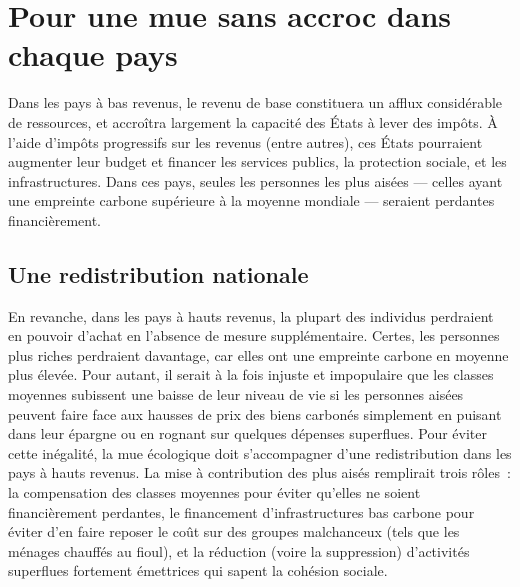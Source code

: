 \documentclass[a5paper,french,openany]{memoir}
\begin{document}
\section{Pour une mue sans accroc dans chaque pays}\label{sec:mue_nationale}

Dans les pays à bas revenus, le revenu de base constituera un afflux considérable de ressources, et accroîtra largement la capacité des États à lever des impôts. À l'aide d'impôts progressifs sur les revenus (entre autres), ces États pourraient augmenter leur budget et financer les services publics, la protection sociale, et les infrastructures. Dans ces pays, seules les personnes les plus aisées --- celles ayant une empreinte carbone supérieure à la moyenne mondiale --- seraient perdantes financièrement. 

\subsection{Une redistribution nationale} %
En revanche, dans les pays à hauts revenus, la plupart des individus perdraient en pouvoir d'achat en l'absence de mesure supplémentaire. Certes, les personnes plus riches perdraient davantage, car elles ont une empreinte carbone en moyenne plus élevée. Pour autant, il serait à la fois injuste et impopulaire que les classes moyennes subissent une baisse de leur niveau de vie si les personnes aisées peuvent faire face aux hausses de prix des biens carbonés simplement en puisant dans leur épargne ou en rognant sur quelques dépenses superflues. Pour éviter cette inégalité, la mue écologique doit s'accompagner d'une redistribution dans les pays à hauts revenus. La mise à contribution des plus aisés remplirait trois rôles~: la compensation des classes moyennes pour éviter qu'elles ne soient financièrement perdantes, le financement d'infrastructures bas carbone pour éviter d'en faire reposer le coût sur des groupes malchanceux (tels que les ménages chauffés au fioul), %
et la réduction (voire la suppression) d'activités superflues fortement émettrices qui sapent la cohésion sociale.
\end{document}
